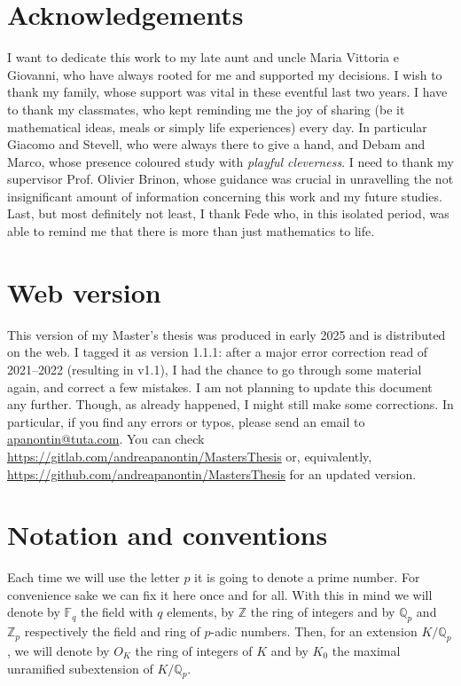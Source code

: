 \section*{Acknowledgements}
I want to dedicate this work to my late aunt and uncle Maria Vittoria e Giovanni,
who have always rooted for me and supported my decisions.
I wish to thank my family, whose support was vital in these eventful last two years.
I have to thank my classmates, who kept reminding me the joy of sharing
(be it mathematical ideas, meals or simply life experiences) every day.
In particular Giacomo and Stevell, who were always there to give a hand, and 
Debam and Marco, whose presence coloured study with \emph{playful cleverness}.
I need to thank my supervisor Prof. Olivier Brinon, whose guidance was crucial in unravelling
the not insignificant amount of information concerning this work and my future studies.
Last, but most definitely not least, I thank Fede who, in this isolated period,
was able to remind me that there is more than just mathematics to life.
\newpage



\section*{Web version}
This version of my Master's thesis was produced in early 2025
and is distributed on the web.
I tagged it as version 1.1.1: after a major error correction read
of 2021--2022 (resulting in v1.1),
I had the chance to go through some material again, and correct a few mistakes.
I am not planning to update this document any further.
Though, as already happened, I might still make some corrections.
In particular, if you find any errors or typos, please send an email to
\href{mailto:apanontin@tuta.com}{apanontin@tuta.com}.
You can check \url{https://gitlab.com/andreapanontin/MastersThesis} or, equivalently,
\url{https://github.com/andreapanontin/MastersThesis}
for an updated version.



\section*{Notation and conventions}
Each time we will use the letter $p$ it is going to denote a prime number.
For convenience sake we can fix it here once and for all.
With this in mind we will denote by $\mathbb{F}_{q}$ the field with $q$ elements,
by $\mathbb{Z}$ the ring of integers and by $\mathbb{Q}_p$ and $\mathbb{Z}_{p}$
respectively the field and ring of $p$-adic numbers.
Then, for an extension $K/\mathbb{Q}_p$, we will denote by $O_K$ the ring of
integers of $K$ and by $K_0$ the maximal unramified subextension of $K/\mathbb{Q}_p$.

